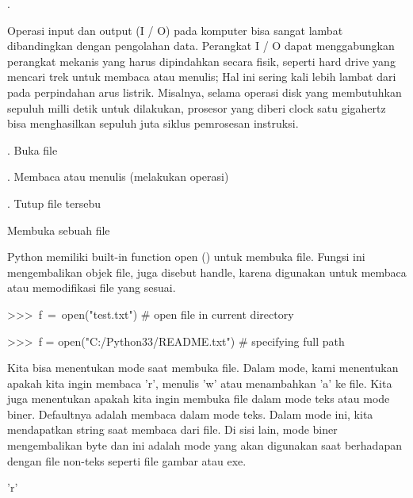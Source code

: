 . \par
Operasi input dan output (I / O) pada komputer bisa sangat lambat dibandingkan dengan pengolahan data. Perangkat I / O dapat menggabungkan perangkat mekanis yang harus dipindahkan secara fisik, seperti hard drive yang mencari trek untuk membaca atau menulis; Hal ini sering kali  lebih lambat dari pada perpindahan arus listrik. Misalnya, selama operasi disk yang membutuhkan sepuluh milli detik untuk dilakukan, prosesor yang diberi clock satu gigahertz bisa menghasilkan sepuluh juta siklus pemrosesan instruksi. \par
\vspace{12pt}
. \hspace*{0.5in} Buka file \par
{}. \hspace*{0.5in} Membaca atau menulis (melakukan operasi) \par
{}. \hspace*{0.5in} Tutup file tersebu \par
\vspace{12pt}
\vspace{12pt}
\vspace{12pt}
\noindent 
Membuka sebuah file \par
\noindent 
Python memiliki built-in function open () untuk membuka file. Fungsi ini mengembalikan objek file, juga disebut handle, karena digunakan untuk membaca atau memodifikasi file yang sesuai. \par
\vspace{12pt}
\noindent 
>>>~f~=~open("test.txt")     $  \#  $ open file in current directory \par
\noindent 
>>>~f = open("C:/Python33/README.txt")   $  \#  $ specifying full path \par
\vspace{12pt}
Kita bisa menentukan mode saat membuka file. Dalam mode, kami menentukan apakah kita ingin membaca 'r', menulis 'w' atau menambahkan 'a' ke file. Kita juga menentukan apakah kita ingin membuka file dalam mode teks atau mode biner. Defaultnya adalah membaca dalam mode teks. Dalam mode ini, kita mendapatkan string saat membaca dari file. Di sisi lain, mode biner mengembalikan byte dan ini adalah mode yang akan digunakan saat berhadapan dengan file non-teks seperti file gambar atau exe. \par
\vspace{12pt}
\vspace{12pt}
\noindent 
'r' \hspace*{0.5in}  \par
